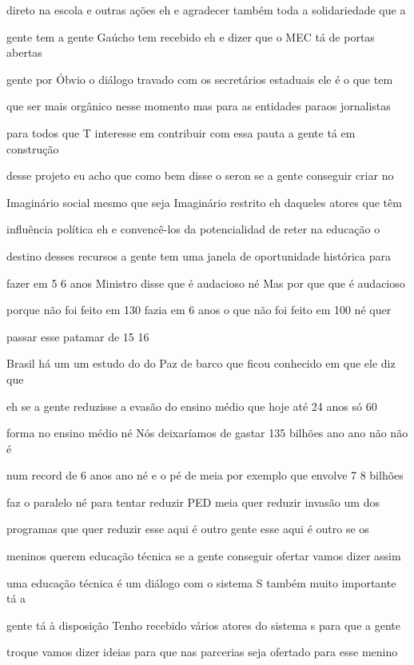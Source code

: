\documentclass[a4paper,12pt]{article}
\begin{document}
direto na escola e outras ações eh e agradecer também toda a solidariedade que a

gente tem a gente Gaúcho tem recebido eh e dizer que o MEC tá de portas abertas

gente por Óbvio o diálogo travado com os secretários estaduais ele é o que tem

que ser mais orgânico nesse momento mas para as entidades paraos jornalistas

para todos que T interesse em contribuir com essa pauta a gente tá em construção

desse projeto eu acho que como bem disse o seron se a gente conseguir criar no

Imaginário social mesmo que seja Imaginário restrito eh daqueles atores que têm

influência política eh e convencê-los da potencialidad de reter na educação o

destino desses recursos a gente tem uma janela de oportunidade histórica para

fazer em 5 6 anos Ministro disse que é audacioso né Mas por que que é audacioso

porque não foi feito em 130 fazia em 6 anos o que não foi feito em 100 né quer

passar esse patamar de 15 16%

Brasil há um um estudo do do Paz de barco que ficou conhecido em que ele diz que

eh se a gente reduzisse a evasão do ensino médio que hoje até 24 anos só 60%

forma no ensino médio né Nós deixaríamos de gastar 135 bilhões ano ano não não é

num record de 6 anos ano né e o pé de meia por exemplo que envolve 7 8 bilhões

faz o paralelo né para tentar reduzir PED meia quer reduzir invasão um dos

programas que quer reduzir esse aqui é outro gente esse aqui é outro se os

meninos querem educação técnica se a gente conseguir ofertar vamos dizer assim

uma educação técnica é um diálogo com o sistema S também muito importante tá a

gente tá à disposição Tenho recebido vários atores do sistema s para que a gente

troque vamos dizer ideias para que nas parcerias seja ofertado para esse menino
\end{document}
